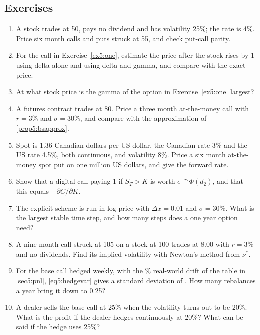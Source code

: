 \begin{chapterrefs}
\section{Exercises}
\label{sec5:exercises}

\begin{enumerate}[label=\textbf{5.\arabic*}, leftmargin=*, ref=5.\arabic*]
  \item\label{ex5:one} A stock trades at 50, pays no dividend and has volatility 25\%; the rate is 4\%.
  Price six month calls and puts struck at 55, and check put-call parity.
  \item\label{ex5:two} For the call in Exercise~\ref{ex5:one}, estimate the price after the stock rises by 1 using
  delta alone and using delta and gamma, and compare with the exact price.
  \item\label{ex5:three} At what stock price is the gamma of the option in Exercise~\ref{ex5:one} largest?
  \item\label{ex5:four} A futures contract trades at 80. Price a three month at-the-money call with
  $r=3\%$ and $\sigma=30\%$, and compare with the approximation of \cref{prop5:bsapprox}.
  \item\label{ex5:five} Spot is 1.36 Canadian dollars per US dollar, the Canadian rate 3\% and the US rate
  4.5\%, both continuous, and volatility 8\%. Price a six month at-the-money spot put on one million US
  dollars, and give the forward rate.
  \item\label{ex5:six} Show that a digital call paying 1 if $S_T>K$ is worth $e^{-r\tau}\Phi(d_2)$, and
  that this equals $-\partial C/\partial K$.
  \item\label{ex5:seven} The explicit scheme is run in log price with $\Delta x=0.01$ and $\sigma=30\%$.
  What is the largest stable time step, and how many steps does a one year option need?
  \item\label{ex5:eight} A nine month call struck at 105 on a stock at 100 trades at 8.00 with $r=3\%$
  and no dividends. Find its implied volatility with Newton's method from $\nu^*$.
  \item\label{ex5:nine} For the base call hedged weekly, with the \hedgeMu\% real-world drift of the
  table in \cref{sec5:pnl}, \cref{eq5:hedgevar} gives a standard deviation of \xvNineSd. How many rebalances a year bring it down to 0.25?
  \item\label{ex5:ten} A dealer sells the base call at 25\% when the volatility turns out to be 20\%. What
  is the profit if the dealer hedges continuously at 20\%? What can be said if the hedge uses 25\%?
\end{enumerate}


\end{chapterrefs}
